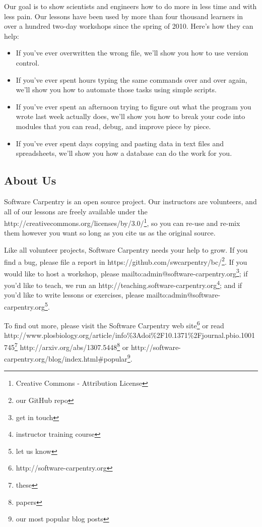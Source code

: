 \documentclass[]{book}
\newcommand{\urlfoot}[2]{{#1}\footnote{#2}}
\begin{document}
Our goal is to show scientists and engineers how to do more in less time
and with less pain. Our lessons have been used by more than four
thousand learners in over a hundred two-day workshops since the spring
of 2010. Here's how they can help:

\begin{itemize}
\item
  If you've ever overwritten the wrong file, we'll show you how to use
  version control.
\item
  If you've ever spent hours typing the same commands over and over
  again, we'll show you how to automate those tasks using simple
  scripts.
\item
  If you've ever spent an afternoon trying to figure out what the
  program you wrote last week actually does, we'll show you how to break
  your code into modules that you can read, debug, and improve piece by
  piece.
\item
  If you've ever spent days copying and pasting data in text files and
  spreadsheets, we'll show you how a database can do the work for you.
\end{itemize}

\subsection{About Us}

Software Carpentry is an open source project. Our instructors are
volunteers, and all of our lessons are freely available under the
\urlfoot{http://creativecommons.org/licenses/by/3.0/}{Creative Commons -
Attribution License}, so you can re-use and re-mix them however you want
so long as you cite us as the original source.

Like all volunteer projects, Software Carpentry needs your help to grow.
If you find a bug, please file a report in
\urlfoot{https://github.com/swcarpentry/bc/}{our GitHub repo}. If you would
like to host a workshop, please
\urlfoot{mailto:admin@software-carpentry.org}{get in touch}; if you'd like
to teach, we run an
\urlfoot{http://teaching.software-carpentry.org}{instructor training
course}; and if you'd like to write lessons or exercises, please
\urlfoot{mailto:admin@software-carpentry.org}{let us know}.

To find out more, please visit the
\urlfoot{Software Carpentry web site}{http://software-carpentry.org}
or read
\urlfoot{http://www.plosbiology.org/article/info\%3Adoi\%2F10.1371\%2Fjournal.pbio.1001745}{these}
\urlfoot{http://arxiv.org/abs/1307.5448}{papers} or
\urlfoot{http://software-carpentry.org/blog/index.html\#popular}{our most
popular blog posts}.
\end{document}

